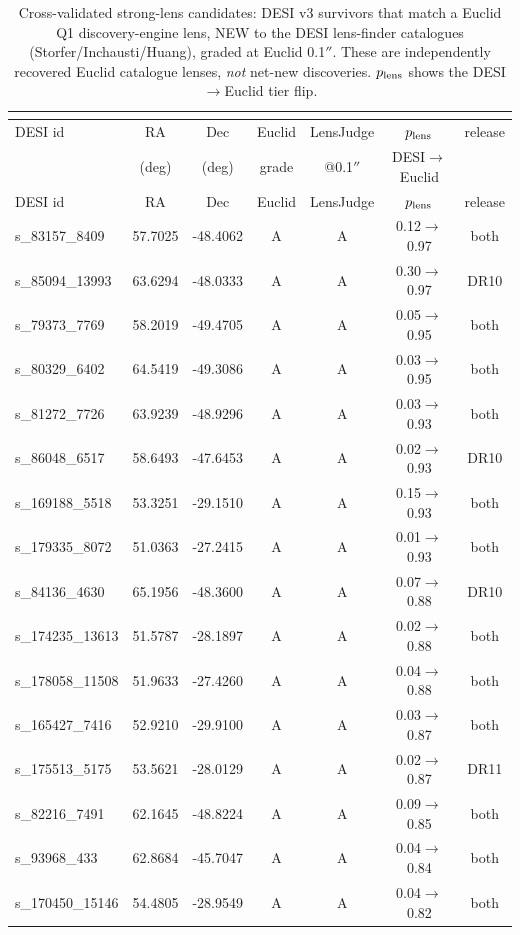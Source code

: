 {\small
\begin{longtable}{lcccccc}
\caption{Cross-validated strong-lens candidates: DESI v3 survivors that match a Euclid Q1 discovery-engine lens, NEW to the DESI lens-finder catalogues (Storfer/Inchausti/Huang), graded at Euclid 0.1$''$. These are independently recovered Euclid catalogue lenses, \emph{not} net-new discoveries. $p_{\rm lens}$ shows the DESI$\to$Euclid tier flip.}\\
\label{tab:catalog}\\
\toprule
DESI id & RA & Dec & Euclid & LensJudge & $p_{\rm lens}$ & release\\
 & (deg) & (deg) & grade & @0.1$''$ & DESI$\to$Euclid & \\
\midrule
\endfirsthead
\toprule DESI id & RA & Dec & Euclid & LensJudge & $p_{\rm lens}$ & release\\\midrule\endhead
s\_83157\_8409 & 57.7025 & -48.4062 & A & A & 0.12$\to$0.97 & both\\
s\_85094\_13993 & 63.6294 & -48.0333 & A & A & 0.30$\to$0.97 & DR10\\
s\_79373\_7769 & 58.2019 & -49.4705 & A & A & 0.05$\to$0.95 & both\\
s\_80329\_6402 & 64.5419 & -49.3086 & A & A & 0.03$\to$0.95 & both\\
s\_81272\_7726 & 63.9239 & -48.9296 & A & A & 0.03$\to$0.93 & both\\
s\_86048\_6517 & 58.6493 & -47.6453 & A & A & 0.02$\to$0.93 & DR10\\
s\_169188\_5518 & 53.3251 & -29.1510 & A & A & 0.15$\to$0.93 & both\\
s\_179335\_8072 & 51.0363 & -27.2415 & A & A & 0.01$\to$0.93 & both\\
s\_84136\_4630 & 65.1956 & -48.3600 & A & A & 0.07$\to$0.88 & DR10\\
s\_174235\_13613 & 51.5787 & -28.1897 & A & A & 0.02$\to$0.88 & both\\
s\_178058\_11508 & 51.9633 & -27.4260 & A & A & 0.04$\to$0.88 & both\\
s\_165427\_7416 & 52.9210 & -29.9100 & A & A & 0.03$\to$0.87 & both\\
s\_175513\_5175 & 53.5621 & -28.0129 & A & A & 0.02$\to$0.87 & DR11\\
s\_82216\_7491 & 62.1645 & -48.8224 & A & A & 0.09$\to$0.85 & both\\
s\_93968\_433 & 62.8684 & -45.7047 & A & A & 0.04$\to$0.84 & both\\
s\_170450\_15146 & 54.4805 & -28.9549 & A & A & 0.04$\to$0.82 & both\\

\end{longtable}}
